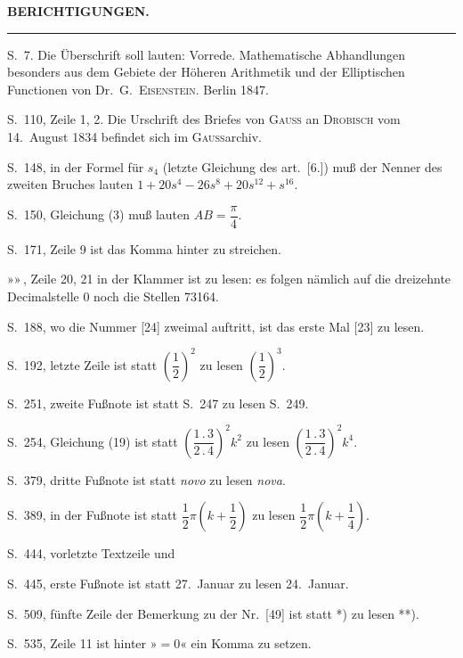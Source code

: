 \clearpage
{}
\NoSourceHead
\begin{center}\Large\bfseries BERICHTIGUNGEN.\end{center}
\begin{center}\rule{.1\linewidth}{.4pt}\end{center}
\medskip
S.\ 7. Die Überschrift soll lauten: Vorrede. Mathematische Abhandlungen besonders aus dem Gebiete der Höheren Arithmetik und der Elliptischen Functionen von Dr.\ G.\ \textsc{Eisenstein}. Berlin 1847.

S.\ 110, Zeile 1, 2. Die Urschrift des Briefes von \textsc{Gauss} an \textsc{Drobisch} vom 14.\ August 1834 befindet sich im \textsc{Gauss}archiv.

S.\ 148, in der Formel für $s_4$ (letzte Gleichung des art.\ [6.]) muß der Nenner des zweiten Bruches lauten $1+20s^4-26s^8+20s^{12}+s^{16}$.

S.\ 150, Gleichung (3) muß lauten $AB=\dfrac{\pi}{4}$.

S.\ 171, Zeile 9 ist das Komma hinter  zu streichen.

»\quad »\,, Zeile 20, 21 in der Klammer ist zu lesen: es folgen nämlich auf die dreizehnte Decimalstelle 0 noch die Stellen 73164.

S.\ 188, wo die Nummer [24] zweimal auftritt, ist das erste Mal [23] zu lesen.

S.\ 192, letzte Zeile ist statt $\left(\dfrac{1}{2}\right)^2$ zu lesen $\left(\dfrac{1}{2}\right)^3$.

S.\ 251, zweite Fußnote ist statt S.\ 247 zu lesen S.\ 249.

S.\ 254, Gleichung (19) ist statt $\left(\dfrac{1\mathbin{.}3}{2\mathbin{.}4}\right)^2k^2$ zu lesen $\left(\dfrac{1\mathbin{.}3}{2\mathbin{.}4}\right)^2k^4$.

S.\ 379, dritte Fußnote ist statt \emph{novo} zu lesen \emph{nova}.

S.\ 389, in der Fußnote ist statt $\dfrac{1}{2}\pi\left(k+\dfrac{1}{2}\right)$ zu lesen $\dfrac{1}{2}\pi\left(k+\dfrac{1}{4}\right)$.

S.\ 444, vorletzte Textzeile und

S.\ 445, erste Fußnote ist statt 27.\ Januar zu lesen 24.\ Januar.

S.\ 509, fünfte Zeile der Bemerkung zu der Nr.\ [49] ist statt *) zu lesen **).

S.\ 535, Zeile 11 ist hinter »$=0$« ein Komma zu setzen.
\ClosingRule
